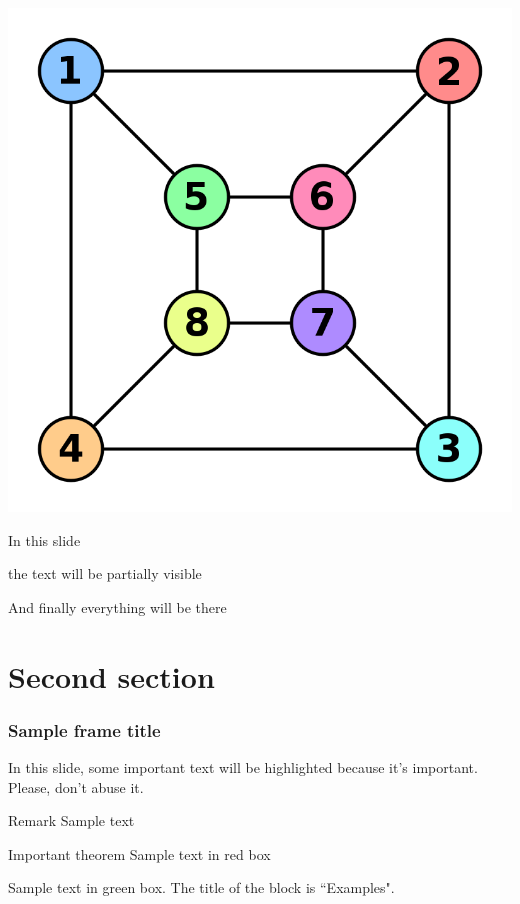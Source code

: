 \documentclass{beamer}
\begin{document}
\begin{frame}
  \includegraphics[scale=0.2]{figs/Graph_isomorphism_b.png}

\end{frame}



\begin{frame}
In this slide \pause

the text will be partially visible \pause

And finally everything will be there
\end{frame}

\section{Second section}

\begin{frame}
\frametitle{Sample frame title}

In this slide, some important text will be
\alert{highlighted} because it's important.
Please, don't abuse it.

\begin{block}{Remark}
Sample text
\end{block}

\begin{alertblock}{Important theorem}
Sample text in red box
\end{alertblock}

\begin{examples}
Sample text in green box. The title of the block is ``Examples".
\end{examples}
\end{frame}
\end{document}
